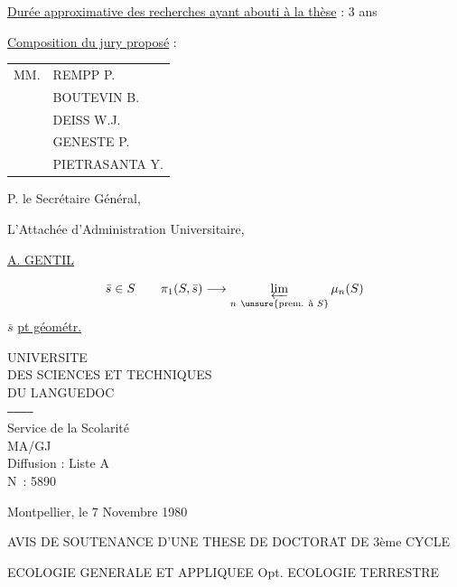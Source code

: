 \uline{Durée approximative des recherches ayant abouti à la thèse} : 3 ans

\uline{Composition du jury proposé} :
\begin{tabular}{ll}
MM.&REMPP P.\\
& BOUTEVIN B.\\
& DEISS W.J.\\
& GENESTE P.\\
& PIETRASANTA Y.
\end{tabular}

P. le Secrétaire Général,

L'Attachée d'Administration Universitaire,

\uline{}

\uline{A. GENTIL}

\[
\bar s\in S\qquad
\pi_1(S,\bar s)\longrightarrow
\varprojlim_{n\ \unsure{\text{prem. à }S}}\mu_n(S)
\]
$\bar s$ \uline{pt géométr.}




UNIVERSITE\\
DES SCIENCES ET TECHNIQUES\\
DU LANGUEDOC\\
\texttt{------------}\\
Service de la Scolarité\\
MA/GJ\\
Diffusion : Liste A\\
N\textdegree\ : 5890

Montpellier, le 7 Novembre 1980

AVIS DE SOUTENANCE D'UNE THESE DE DOCTORAT DE 3ème CYCLE

ECOLOGIE GENERALE ET APPLIQUEE Opt. ECOLOGIE TERRESTRE


